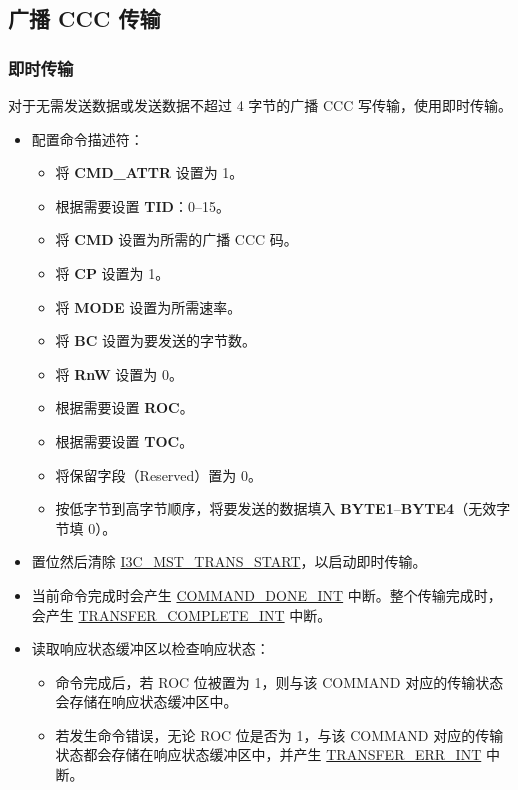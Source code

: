 \documentclass[main\_\_CN.tex]{subfiles}
\begin{document}
\subsection{广播 CCC 传输}

\subsubsection{即时传输}
对于无需发送数据或发送数据不超过 4 字节的广播 CCC 写传输，使用即时传输。

\begin{itemize}
    \item 配置命令描述符：
    \begin{itemize}
        \item 将 \textbf{CMD\_ATTR} 设置为 1。
        \item 根据需要设置 \textbf{TID}：0–15。
        \item 将 \textbf{CMD} 设置为所需的广播 CCC 码。
        \item 将 \textbf{CP} 设置为 1。
        \item 将 \textbf{MODE} 设置为所需速率。
        \item 将 \textbf{BC} 设置为要发送的字节数。
        \item 将 \textbf{RnW} 设置为 0。
        \item 根据需要设置 \textbf{ROC}。
        \item 根据需要设置 \textbf{TOC}。
        \item 将保留字段（Reserved）置为 0。
        \item 按低字节到高字节顺序，将要发送的数据填入 \textbf{BYTE1}–\textbf{BYTE4}（无效字节填 0）。
    \end{itemize}
    \item 置位然后清除 \hyperref[fielddesc:I3CMSTREGTRANSSTART]{I3C\_MST\_TRANS\_START}，以启动即时传输。
    \item 当前命令完成时会产生 \hyperref[int:COMMANDDONEINT]{COMMAND\_DONE\_INT} 中断。整个传输完成时，会产生 \hyperref[int:TRANSFERCOMPLETEINT]{TRANSFER\_COMPLETE\_INT} 中断。
    \item 读取响应状态缓冲区以检查响应状态：
    \begin{itemize}
        \item 命令完成后，若 ROC 位被置为 1，则与该 COMMAND 对应的传输状态会存储在响应状态缓冲区中。
        \item 若发生命令错误，无论 ROC 位是否为 1，与该 COMMAND 对应的传输状态都会存储在响应状态缓冲区中，并产生 \hyperref[int:TRANSFERERRINT]{TRANSFER\_ERR\_INT} 中断。
    \end{itemize}
\end{itemize}
\end{document}
